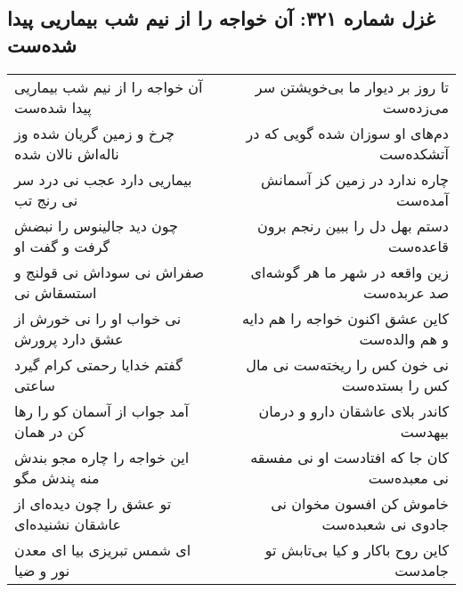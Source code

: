 \begin{center}
\section*{غزل شماره ۳۲۱: آن خواجه را از نیم شب بیماریی پیدا شده‌ست}
\label{sec:0321}
\begin{longtable}{l p{0.5cm} r}
آن خواجه را از نیم شب بیماریی پیدا شده‌ست
&&
تا روز بر دیوار ما بی‌خویشتن سر می‌زده‌ست
\\
چرخ و زمین گریان شده وز ناله‌اش نالان شده
&&
دم‌های او سوزان شده گویی که در آتشکده‌ست
\\
بیماریی دارد عجب نی درد سر نی رنج تب
&&
چاره ندارد در زمین کز آسمانش آمده‌ست
\\
چون دید جالینوس را نبضش گرفت و گفت او
&&
دستم بهل دل را ببین رنجم برون قاعده‌ست
\\
صفراش نی سوداش نی قولنج و استسقاش نی
&&
زین واقعه در شهر ما هر گوشه‌ای صد عربده‌ست
\\
نی خواب او را نی خورش از عشق دارد پرورش
&&
کاین عشق اکنون خواجه را هم دایه و هم والده‌ست
\\
گفتم خدایا رحمتی کرام گیرد ساعتی
&&
نی خون کس را ریخته‌ست نی مال کس را بستده‌ست
\\
آمد جواب از آسمان کو را رها کن در همان
&&
کاندر بلای عاشقان دارو و درمان بیهدست
\\
این خواجه را چاره مجو بندش منه پندش مگو
&&
کان جا که افتادست او نی مفسقه نی معبده‌ست
\\
تو عشق را چون دیده‌ای از عاشقان نشنیده‌ای
&&
خاموش کن افسون مخوان نی جادوی نی شعبده‌ست
\\
ای شمس تبریزی بیا ای معدن نور و ضیا
&&
کاین روح باکار و کیا بی‌تابش تو جامدست
\\
\end{longtable}
\end{center}
